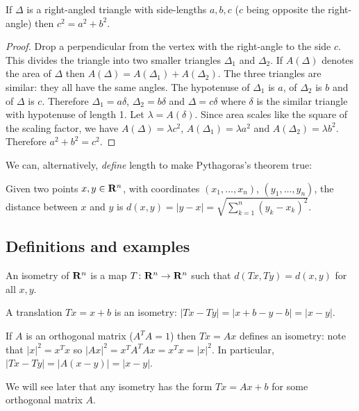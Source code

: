 \documentclass[12pt]{article}
\begin{document}
\begin{thm}
If $\Delta$ is a right-angled triangle with side-lengths $a,b,c$ ($c$ being opposite the right-angle) then $c^2=a^2+b^2$.
\end{thm}
\begin{proof}
Drop a perpendicular from the vertex with the right-angle to the side $c$. This divides the triangle into two smaller triangles $\Delta_1$ and $\Delta_2$. If $A(\Delta)$ denotes the area of $\Delta$ then $A(\Delta)=A(\Delta_1)+A(\Delta_2)$. The three triangles are similar: they all have the same angles. The hypotenuse of $\Delta_1$ is $a$, of $\Delta_2$ is $b$ and of $\Delta$ is $c$. Therefore $\Delta_1=a\delta$, $\Delta_2=b\delta$ and $\Delta=c\delta$ where $\delta$ is the similar triangle with hypotenuse of length 1. Let $\lambda=A(\delta)$. Since area scales like the square of the scaling factor, we have $A(\Delta)=\lambda c^2$, $A(\Delta_1)=\lambda a^2$ and $A(\Delta_2)=\lambda b^2$. Therefore $a^2+b^2=c^2$.
\end{proof}

We can, alternatively, {\em define} length to make Pythagoras's theorem true:

\begin{dfn}
  Given two points $x,y\in\mathbf{R}^n$, with coordinates $(x_1,\ldots,x_n)$, $(y_1,\ldots,y_n)$, the distance between $x$ and $y$ is $d(x,y)=|y-x|=\sqrt{\sum_{k=1}^n(y_k-x_k)^2}$.
\end{dfn}

\subsection{Definitions and examples}

\begin{dfn}
  An isometry of $\mathbf{R}^n$ is a map $T\colon\mathbf{R}^n\to\mathbf{R}^n$ such that $d(Tx,Ty)=d(x,y)$ for all $x,y$.
\end{dfn}

\begin{exm}
  A translation $Tx=x+b$ is an isometry: $|Tx-Ty|=|x+b-y-b|=|x-y|$.
\end{exm}

\begin{exm}
  If $A$ is an orthogonal matrix ($A^TA=1$) then $Tx=Ax$ defines an isometry: note that $|x|^2=x^Tx$ so $|Ax|^2=x^TA^TAx=x^Tx=|x|^2$. In particular, $|Tx-Ty|=|A(x-y)|=|x-y|$.
\end{exm}

We will see later that any isometry has the form $Tx=Ax+b$ for some orthogonal matrix $A$.
\end{document}
